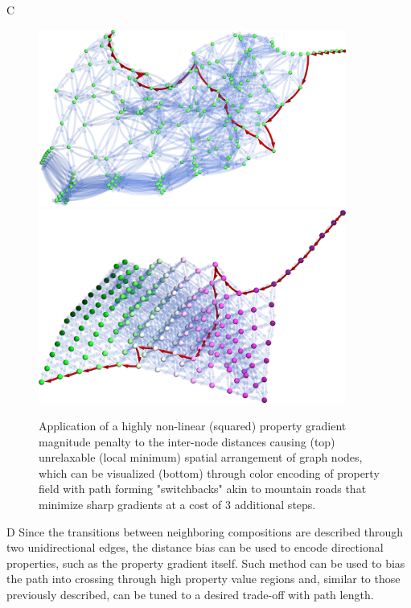 C

\begin{figure}[h]
    \centering
    \includegraphics[width=0.9\textwidth]{pathplanning/InfeasibilityGliding_LowGradientSquared.png}
    \includegraphics[width=0.9\textwidth]{pathplanning/InfeasibilityGliding_LowGradientSquaredColored.png}
    \caption{Application of a highly non-linear (squared) property gradient magnitude penalty to the inter-node distances causing (top) unrelaxable (local minimum) spatial arrangement of graph nodes, which can be visualized (bottom) through color encoding of property field with path forming "switchbacks" akin to mountain roads that minimize sharp gradients at a cost of 3 additional steps.}
    \label{fig:lowgradientsquared}
\end{figure}

D
Since the transitions between neighboring compositions are described through two unidirectional edges, the distance bias can be used to encode directional properties, such as the property gradient itself. Such method can be used to bias the path into crossing through high property value regions and, similar to those previously described, can be tuned to a desired trade-off with path length.

